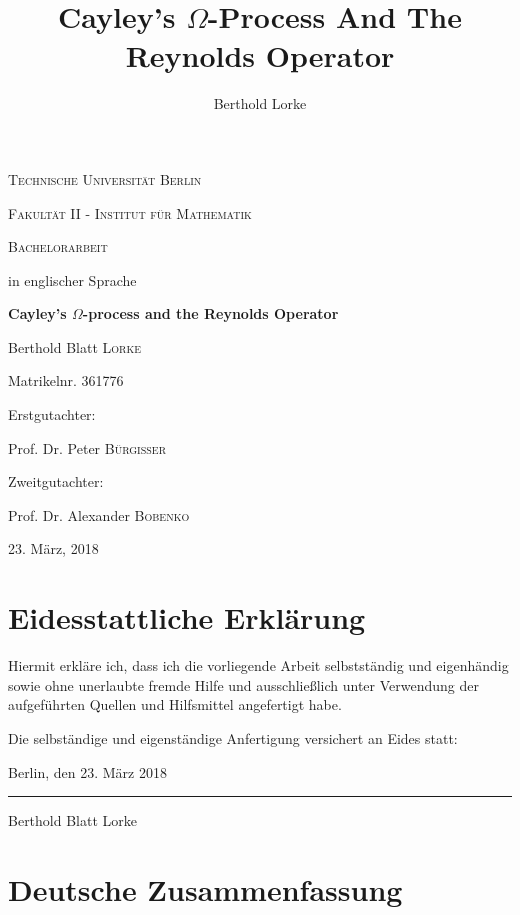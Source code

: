 \documentclass[a4paper]{article}
\title{Cayley's $\Omega$-Process And The Reynolds Operator}
\author{Berthold Lorke}
\theoremstyle{prrt}
\begin{document}


\begin{titlepage}
  \centering
  {\scshape\LARGE Technische Universit\"at Berlin\par}
  \vspace{0.5cm}
  {\scshape\LARGE Fakult\"at II - Institut f\"ur Mathematik\par}
  \vspace{1cm}
  {\scshape\Large Bachelorarbeit\par}
  \vspace{0.5cm}
  {in englischer Sprache\par}
  \vspace{1.5cm}
  {\huge\bfseries Cayley's $\Omega$-process and the Reynolds Operator\par}
  \vspace{2cm}
  {\Large Berthold Blatt \textsc{Lorke}\par}
  {\Large Matrikelnr. 361776\par}
  \vfill
  Erstgutachter:\par
  Prof. Dr. Peter \textsc{B\"urgisser}\par
  Zweitgutachter:\par
  Prof. Dr. Alexander \textsc{Bobenko}\par
  \vfill

  {\large 23. M\"arz, 2018 \par}
\end{titlepage}

\section*{Eidesstattliche Erkl\"arung}
Hiermit erkl\"are ich, dass ich die vorliegende Arbeit selbstst\"andig und eigenh\"andig sowie ohne unerlaubte fremde Hilfe und ausschließlich unter Verwendung der aufgef\"uhrten Quellen und Hilfsmittel angefertigt habe.

\vspace{4cm}
Die selbst\"andige und eigenst\"andige Anfertigung versichert an Eides statt:

\vspace{2cm}
Berlin, den 23. M\"arz 2018

\vspace{1cm}
\rule{5cm}{0.4pt}

Berthold Blatt Lorke
\newpage
\section*{Deutsche Zusammenfassung}
\end{document}
